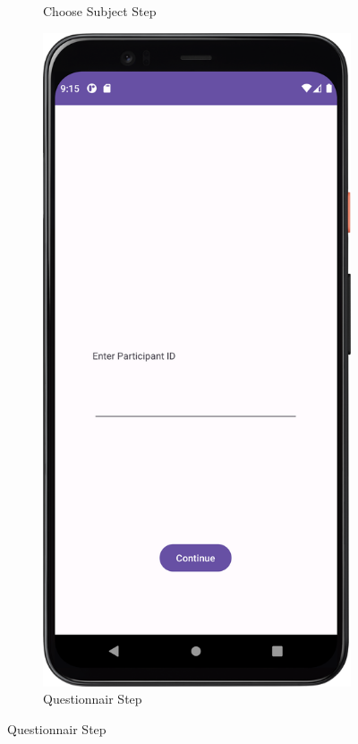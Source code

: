 \begin{figure}[htbp]
\begin{subfigure}[b]{0.25\textwidth}
        \caption{Choose Subject Step}
        \label{subfig:chooseTestSubject2}
    \end{subfigure}
    \hspace{1cm}
    \begin{subfigure}[b]{0.25\textwidth}
        \centering
        \includegraphics[width=\textwidth]{content/06_demonstration_of_the_artifact/Screenshot_ParticipantSelectionScreen.png}
        \caption{Questionnair Step}
        \label{subfig:Questionair2}
    \end{subfigure}


\end{figure}
